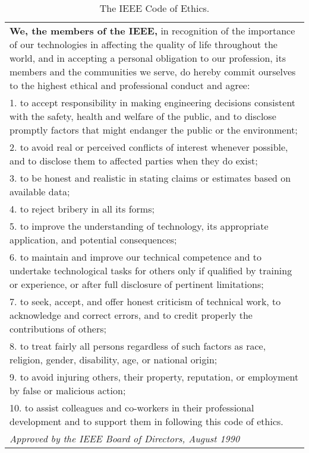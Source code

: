 \begin{table}[h]
\caption{ The IEEE Code of Ethics.}
\label{table:IEEEcodeOfEthics}
\begin{tabular}{|m{15cm}|}
\hline

\textbf{We, the members of the IEEE,} in recognition of the importance
of our technologies in affecting the quality of life throughout the
world, and in accepting a personal obligation to our profession, its
members and the communities we serve, do hereby commit ourselves to the
highest ethical and professional conduct and agree:\\

1. to accept responsibility in making engineering decisions consistent
with the safety, health and welfare of the public, and to disclose
promptly factors that might endanger the public or the environment;\\

2. to avoid real or perceived conflicts of interest whenever possible,
and to disclose them to affected parties when they do exist;\\

3. to be honest and realistic in stating claims or estimates based on
available data;\\

4. to reject bribery in all its forms;\\

5. to improve the understanding of technology, its appropriate
application, and potential consequences;\\

6. to maintain and improve our technical competence and to undertake
technological tasks for others only if qualified by training or
experience, or after full disclosure of pertinent limitations;\\

7. to seek, accept, and offer honest criticism of technical work, to
acknowledge and correct errors, and to credit properly the contributions
of others;\\

8. to treat fairly all persons regardless of such factors as race,
religion, gender, disability, age, or national origin;\\

9. to avoid injuring others, their property, reputation, or employment
by false or malicious action;\\

10. to assist colleagues and co-workers in their professional
development and to support them in following this code of ethics.\\

\emph{Approved by the IEEE Board of Directors, August 1990}
\end{tabular}
\end{table}


